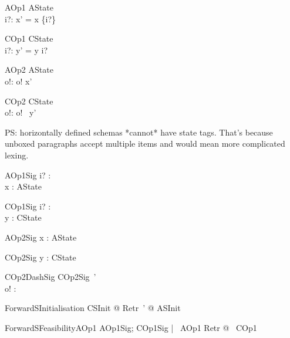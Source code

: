 \begin{schema}{AOp1}
   \Delta AState \\
   i?: \nat
\where
   x' = x \cup \{i?\}
\end{schema}

\begin{schema}{COp1}
   \Delta CState \\
   i?: \nat
\where
   y' = y \cat \langle i? \rangle
\end{schema}

\begin{schema}{AOp2}
   \Xi AState \\
   o!: \nat
\where
    o! \in  x' 
\end{schema}

\begin{schema}{COp2}
   \Xi CState \\
   o!: \nat
\where
   o! \in \ran~y'
\end{schema}

PS: horizontally defined schemas *cannot* have state tags. That's because
unboxed paragraphs accept multiple items and would mean more complicated lexing.

\begin{schema}{AOp1Sig}
 i? : \nat \\
 x : \power \nat 
\where
 AState
\end{schema}

\begin{schema}{COp1Sig}
 i? : \nat \\
 y : \seq \nat 
\where
 CState
\end{schema}

\begin{schema}{AOp2Sig}
 x : \power \nat 
\where
 AState
\end{schema}

\begin{schema}{COp2Sig}
 y : \seq \nat 
\where
 CState
\end{schema}

\begin{schema}{COp2DashSig}
   COp2Sig~' \\
   o! : \nat
\end{schema}

\begin{theorem}{ForwardSInitialisation} 
   \forall CSInit @ \exists Retr~' @ ASInit
\end{theorem}

\begin{theorem}{ForwardSFeasibilityAOp1} 
   \forall AOp1Sig; COp1Sig | \pre~AOp1 \land Retr @ \pre~COp1
\end{theorem}

